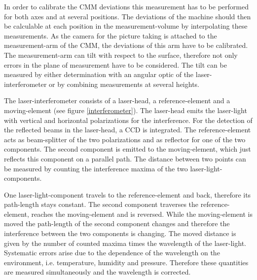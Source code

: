 \documentclass[
twoside,            %
BCOR1.4cm,          %
10pt,               %
headings=normal,    %
headsepline,        %
clearplainpage,		%
final,              %
div=14,
open=right,
bibliography=toc
]{scrreprt}
\begin{document}
In order to calibrate the CMM deviations this measurement has to be performed for both axes and at several positions.
The deviations of the machine should then be calculable at each position in the measurement-volume by interpolating these measurements.
As the camera for the picture taking is attached to the measurement-arm of the CMM, the deviations of this arm have to be calibrated.
The measurement-arm can tilt with respect to the surface, therefore not only errors in the plane of measurement have to be considered.
The tilt can be measured by either determination with an angular optic of the laser-interferometer or by combining measurements at several heights.

The laser-interferometer consists of a laser-head, a reference-element and a moving-element (see figure \ref{interferometer}).
The laser-head emits the laser-light with vertical and horizontal polarizations for the interference.
For the detection of the reflected beams in the laser-head, a CCD is integrated.
The reference-element acts as beam-splitter of the two polarizations and as reflector for one of the two components.
The second component is emitted to the moving-element, which just reflects this component on a parallel path.
The distance between two points can be measured by counting the interference maxima of the two laser-light-components.

One laser-light-component travels to the reference-element and back, therefore its path-length stays constant.
The second component traverses the reference-element, reaches the moving-element and is reversed.
While the moving-element is moved the path-length of the second component changes and therefore the interference between the two components is changing.
The moved distance is given by the number of counted maxima times the wavelength of the laser-light.
Systematic errors arise due to the dependence of the wavelength on the environment, i.e. temperature, humidity and pressure.
Therefore these quantities are measured simultaneously and the wavelength is corrected.
\end{document}
